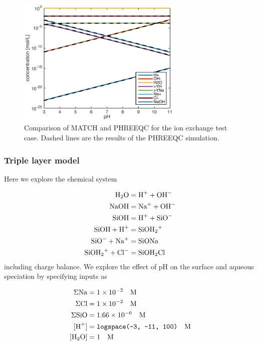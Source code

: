 \documentclass{article}
\begin{document}
\begin{figure}[H]
    \centering
    \includegraphics[width=0.7\textwidth]{exchange.pdf}
    \caption{Comparison of MATCH and PHREEQC for the ion exchange test case. Dashed lines are the results of the PHREEQC simulation.}
    \label{fig:exchange}
\end{figure}

\subsubsection{Triple layer model}
Here we explore the chemical system

\begin{align}
    \ce{H2O} &= \ce{H+} + \ce{OH-}\\
    \ce{NaOH}&= \ce{Na+} + \ce{OH-}\\
    \ce{SiOH} &= \ce{H+} + \ce{SiO-}\\
    \ce{SiOH} + \ce{H+} &= \ce{SiOH2+}\\
    \ce{SiO-} + \ce{Na+} &= \ce{SiONa}\\
    \ce{SiOH2+} + \ce{Cl-} &= \ce{SiOH2Cl}
\end{align}
including charge balance. We explore the effect of pH on the surface and aqueous speciation by specifying inputs as

\begin{align}
\Sigma \ce{Na} &= 1\times10^{-2} \quad\text{M}\\
\Sigma \ce{Cl} &= 1\times10^{-2} \quad\text{M}\\
\Sigma \ce{SiO} &= 1.66\times10^{-6} \quad\text{M}\\
[\ce{H+}] &= \texttt{logspace(-3, -11, 100)} \quad\text{M}\\
[\ce{H2O}] & = 1 \quad\text{M}
\end{align}
\end{document}
